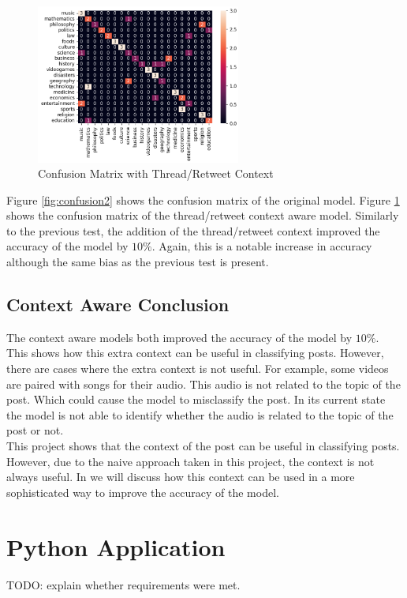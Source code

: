 \begin{figure}
    \centering
    \includegraphics[width=0.6\textwidth]{../images/confusion/RoBERTa-thread-20.png}
    \caption{Confusion Matrix with Thread/Retweet Context}
    \label{fig:retweet}
\end{figure}

Figure \ref{fig:confusion2} shows the confusion matrix of the original model. Figure \ref{fig:retweet} shows the confusion matrix of the
thread/retweet context aware model. Similarly to the previous test, the addition of the thread/retweet context improved the accuracy of
the model by $10\%$. Again, this is a notable increase in accuracy although the same bias as the previous test is present.

\subsection{Context Aware Conclusion}
The context aware models both improved the accuracy of the model by $10\%$. This shows how this extra context can be useful in
classifying posts. However, there are cases where the extra context is not useful. For example, some videos are paired with songs for
their audio. This audio is not related to the topic of the post. Which could cause the model to misclassify the post. In its current state
the model is not able to identify whether the audio is related to the topic of the post or not.\\
This project shows that the context of the post can be useful in classifying posts. However, due to the naive approach taken
in this project, the context is not always useful. In  we will discuss how this context can be used in a more
sophisticated way to improve the accuracy of the model.

\section{Python Application}
TODO: explain whether requirements were met.